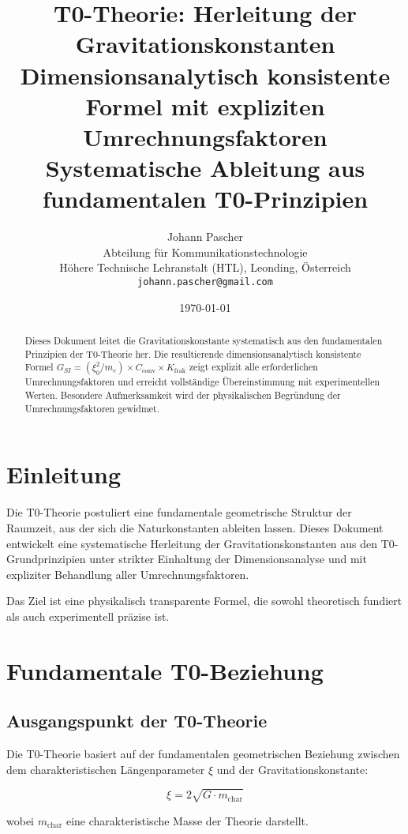 \documentclass[12pt,a4paper]{article}
\title{\textbf{T0-Theorie: Herleitung der Gravitationskonstanten}\\
	\large Dimensionsanalytisch konsistente Formel mit expliziten Umrechnungsfaktoren\\[0.3cm]
	\normalsize Systematische Ableitung aus fundamentalen T0-Prinzipien}
\author{Johann Pascher\\
	Abteilung für Kommunikationstechnologie\\
	Höhere Technische Lehranstalt (HTL), Leonding, Österreich\\
	\texttt{johann.pascher@gmail.com}}
\date{\today}
\newcommand{\Kfrak}{K_{\text{frak}}}
\newcommand{\Cconv}{C_{\text{conv}}}
\begin{document}
	
	\maketitle
	
	\begin{abstract}
		Dieses Dokument leitet die Gravitationskonstante systematisch aus den fundamentalen Prinzipien der T0-Theorie her. Die resultierende dimensionsanalytisch konsistente Formel $G_{SI} = (\xi_0^2/m_e) \times \Cconv \times \Kfrak$ zeigt explizit alle erforderlichen Umrechnungsfaktoren und erreicht vollständige Übereinstimmung mit experimentellen Werten. Besondere Aufmerksamkeit wird der physikalischen Begründung der Umrechnungsfaktoren gewidmet.
	\end{abstract}
	
	\tableofcontents
	\newpage
	
	\section{Einleitung}
	
	Die T0-Theorie postuliert eine fundamentale geometrische Struktur der Raumzeit, aus der sich die Naturkonstanten ableiten lassen. Dieses Dokument entwickelt eine systematische Herleitung der Gravitationskonstanten aus den T0-Grundprinzipien unter strikter Einhaltung der Dimensionsanalyse und mit expliziter Behandlung aller Umrechnungsfaktoren.
	
	Das Ziel ist eine physikalisch transparente Formel, die sowohl theoretisch fundiert als auch experimentell präzise ist.
	
	\section{Fundamentale T0-Beziehung}
	
	\subsection{Ausgangspunkt der T0-Theorie}
	
	Die T0-Theorie basiert auf der fundamentalen geometrischen Beziehung zwischen dem charakteristischen Längenparameter $\xi$ und der Gravitationskonstante:
	
	\begin{equation}
		\xi = 2\sqrt{G \cdot m_{\text{char}}}
		\label{eq:t0_fundamental}
	\end{equation}
	
	wobei $m_{\text{char}}$ eine charakteristische Masse der Theorie darstellt.
	
\end{document}
